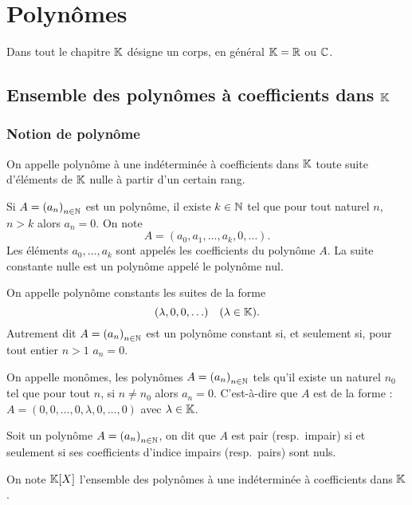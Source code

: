 \chapter{Polynômes}\label{chap:polynomes}
\minitoc%
\minilof%
\minilot%

Dans tout le chapitre \(\mathbb{K}\) désigne un corps, en général \(\mathbb{K} = \mathbb{R}\) ou \(\mathbb{C}\).

\section{Ensemble des polynômes à coefficients dans \(\mathbb{K}\)}

\subsection{Notion de polynôme}

\begin{defdef}
  On appelle polynôme à une indéterminée à coefficients dans \(\mathbb{K}\) toute suite 
  d'éléments de \(\mathbb{K}\) nulle à partir d'un certain rang.
\end{defdef}

Si \(A = {(a_n)}_{n \in \mathbb{N}}\) est un polynôme, il existe \(k \in \mathbb{N}\) tel que pour 
tout naturel \(n\), \(n > k\) alors \(a_n = 0\). On note
\begin{equation}
  A = (a_0, a_1, \ldots, a_k, 0, \ldots).
\end{equation}
Les éléments \(a_0, \ldots, a_k\) sont appelés les coefficients du polynôme 
\(A\). La suite constante nulle est un polynôme appelé le polynôme nul.

On appelle polynôme constants les suites de la forme
\begin{equation}
  (\lambda, 0, 0, \ldots) \quad (\lambda \in \mathbb{K}).
\end{equation}
Autrement dit \(A = {(a_n)}_{n \in \mathbb{N}}\) est un polynôme constant si, et seulement 
si, pour tout entier \(n > 1\) \(a_n = 0\).

On appelle monômes, les polynômes \(A = {(a_n)}_{n \in \mathbb{N}}\) tels qu'il existe un 
naturel \(n_0\) tel que pour tout \(n\), si \(n \neq n_0\) alors \(a_n = 0\). 
C'est-à-dire que \(A\) est de la forme : \(A = (0, 0, \ldots, 0,\lambda,0, \ldots, 
0)\) avec \(\lambda \in \mathbb{K}\).

Soit un polynôme \(A = {(a_n)}_{n \in \mathbb{N}}\), on dit que \(A\) est pair (resp.\ 
impair) si et seulement si ses coefficients d'indice impairs (resp.\ pairs) sont 
nuls.

On note \(\mathbb{K}[X]\) l'ensemble des polynômes à une indéterminée à coefficients 
dans \(\mathbb{K}\).

